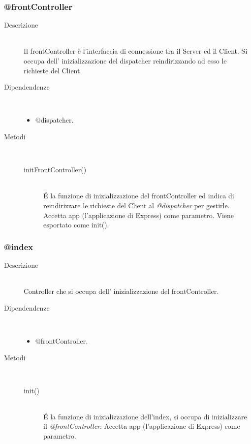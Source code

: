 \subsubsection{@frontController}
\begin{description}
 \item[Descrizione] \hfill \\
 Il frontController è l'interfaccia di connessione tra il Server ed il Client. Si occupa dell' inizializzazione del dispatcher reindirizzando ad esso le richieste del Client.
 \item[Dipendendenze] \hfill \\
 \begin{itemize}
 \item @dispatcher.
 \end{itemize}
 \item[Metodi] \hfill \\
  \begin{description}
    \item[initFrontController()]\hfill \\
  	\'{E} la funzione di inizializzazione del frontController ed indica di reindirizzare le richieste del Client al \textit{@dispatcher} per gestirle. Accetta  app (l'applicazione di Express) come parametro. Viene esportato come init().
  \end{description}
\end{description}

\subsubsection{@index}
\begin{description}
 \item[Descrizione] \hfill \\
  Controller che si occupa dell' inizializzazione del frontController.
 \item[Dipendendenze] \hfill \\
 \begin{itemize}
 \item @frontController.
 \end{itemize}
 \item[Metodi] \hfill \\
  \begin{description}
    \item[init()]\hfill \\
  	\'{E} la funzione di inizializzazione dell'index, si occupa di inizializzare il \textit{@frontController}. Accetta  app (l'applicazione di Express) come parametro.
  \end{description}
\end{description}

